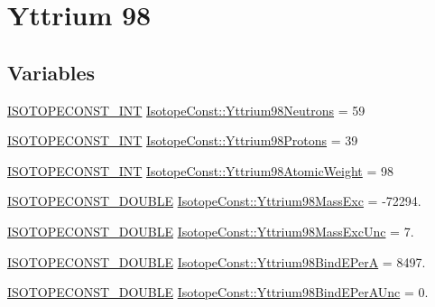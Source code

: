 \hypertarget{group___isotope_const-_yttrium-_y98}{}\section{Yttrium 98}
\label{group___isotope_const-_yttrium-_y98}
\subsection*{Variables}
\begin{DoxyCompactItemize}
\item 
\mbox{\hyperlink{group___isotope_const-_macros_ga5f18360b3e99483a35c32d789e62621c}{I\+S\+O\+T\+O\+P\+E\+C\+O\+N\+S\+T\+\_\+\+I\+NT}} \mbox{\hyperlink{group___isotope_const-_yttrium-_y98_gac69b25a47e5a6ff26b00bd70472d3a89}{Isotope\+Const\+::\+Yttrium98\+Neutrons}} = 59
\item 
\mbox{\hyperlink{group___isotope_const-_macros_ga5f18360b3e99483a35c32d789e62621c}{I\+S\+O\+T\+O\+P\+E\+C\+O\+N\+S\+T\+\_\+\+I\+NT}} \mbox{\hyperlink{group___isotope_const-_yttrium-_y98_ga075e745923c6c56f67bf7877c6320368}{Isotope\+Const\+::\+Yttrium98\+Protons}} = 39
\item 
\mbox{\hyperlink{group___isotope_const-_macros_ga5f18360b3e99483a35c32d789e62621c}{I\+S\+O\+T\+O\+P\+E\+C\+O\+N\+S\+T\+\_\+\+I\+NT}} \mbox{\hyperlink{group___isotope_const-_yttrium-_y98_gaefa43caa0baf96e3f0be84361388670b}{Isotope\+Const\+::\+Yttrium98\+Atomic\+Weight}} = 98
\item 
\mbox{\hyperlink{group___isotope_const-_macros_ga8f45a7272ce02c0b4c65c44636ed719a}{I\+S\+O\+T\+O\+P\+E\+C\+O\+N\+S\+T\+\_\+\+D\+O\+U\+B\+LE}} \mbox{\hyperlink{group___isotope_const-_yttrium-_y98_ga586e581f2265a0de47999a995ea78c90}{Isotope\+Const\+::\+Yttrium98\+Mass\+Exc}} = -\/72294.
\item 
\mbox{\hyperlink{group___isotope_const-_macros_ga8f45a7272ce02c0b4c65c44636ed719a}{I\+S\+O\+T\+O\+P\+E\+C\+O\+N\+S\+T\+\_\+\+D\+O\+U\+B\+LE}} \mbox{\hyperlink{group___isotope_const-_yttrium-_y98_ga541e0596717afd28a29a821c348d3864}{Isotope\+Const\+::\+Yttrium98\+Mass\+Exc\+Unc}} = 7.
\item 
\mbox{\hyperlink{group___isotope_const-_macros_ga8f45a7272ce02c0b4c65c44636ed719a}{I\+S\+O\+T\+O\+P\+E\+C\+O\+N\+S\+T\+\_\+\+D\+O\+U\+B\+LE}} \mbox{\hyperlink{group___isotope_const-_yttrium-_y98_ga0126abc87da2be2d287ff422139d0c03}{Isotope\+Const\+::\+Yttrium98\+Bind\+E\+PerA}} = 8497.
\item 
\mbox{\hyperlink{group___isotope_const-_macros_ga8f45a7272ce02c0b4c65c44636ed719a}{I\+S\+O\+T\+O\+P\+E\+C\+O\+N\+S\+T\+\_\+\+D\+O\+U\+B\+LE}} \mbox{\hyperlink{group___isotope_const-_yttrium-_y98_ga8d4c1d452f7a2d4dea3a5ca306bcef69}{Isotope\+Const\+::\+Yttrium98\+Bind\+E\+Per\+A\+Unc}} = 0.

\end{DoxyCompactItemize}
